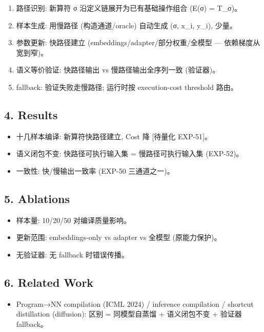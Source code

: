 \documentclass[
]{article}
\providecommand{\tightlist}{%
  \setlength{\itemsep}{0pt}\setlength{\parskip}{0pt}}
\begin{document}
\begin{enumerate}
\def\labelenumi{\arabic{enumi}.}
\tightlist
\item
  路径识别: 新算符 σ 沿定义链展开为已有基础操作组合 (E(σ) = T\_σ)。
\item
  样本生成: 用慢路径 (构造通道/oracle) 自动生成 (σ, x\_i, y\_i), 少量。
\item
  参数更新: 快路径建立 (embeddings/adapter/部分权重/全模型 ---
  依赖梯度从宽到窄)。
\item
  语义等价验证: 快路径输出 vs 慢路径输出全序列一致 (验证器)。
\item
  fallback: 验证失败走慢路径; 运行时按 execution-cost threshold 路由。
\end{enumerate}

\subsection{4. Results}\label{results}

\begin{itemize}
\tightlist
\item
  十几样本编译: 新算符快路径建立, Cost 降 {[}待量化 EXP-51{]}。
\item
  语义闭包不变: 快路径可执行输入集 = 慢路径可执行输入集 (EXP-52)。
\item
  一致性: 快/慢输出一致率 (EXP-50 三通道之一)。
\end{itemize}

\subsection{5. Ablations}\label{ablations}

\begin{itemize}
\tightlist
\item
  样本量: 10/20/50 对编译质量影响。
\item
  更新范围: embeddings-only vs adapter vs 全模型 (原能力保护)。
\item
  无验证器: 无 fallback 时错误传播。
\end{itemize}

\subsection{6. Related Work}\label{related-work}

\begin{itemize}
\tightlist
\item
  Program→NN compilation (ICML 2024) / inference compilation / shortcut
  distillation (diffusion): 区别 = 同模型自蒸馏 + 语义闭包不变 + 验证器
  fallback。
\end{itemize}
\end{document}
